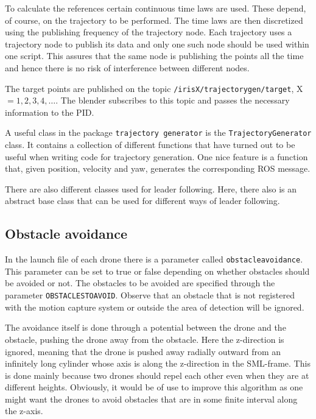 \documentclass[titlepage,11pt,a4paper]{article}
\begin{document}
To calculate the references certain continuous time laws are
used. These depend, of course, on the trajectory to be performed. The
time laws are then discretized using the publishing frequency of the
trajectory node. Each trajectory uses a trajectory node to publish its
data and only one such node should be used within one script. This
assures that the same node is publishing the points all the time and
hence there is no risk of interference between different nodes.

The target points are published on the topic
\texttt{/irisX/trajectory\textunderscore gen/target}, X $= 1, 2, 3,
4, \dots$. The blender subscribes to this topic and passes the
necessary information to the PID.

A useful class in the package \texttt{trajectory\textunderscore
  generator} is the \texttt{TrajectoryGenerator} class. It contains a
collection of different functions that have turned out to be useful
when writing code for trajectory generation. One nice feature is a
function that, given position, velocity and yaw, generates the
corresponding ROS message.

There are also different classes used for leader following. Here,
there also is an abstract base class that can be used for different
ways of leader following.

\subsection{Obstacle avoidance}
\label{subsec:obstacle_avoidance}
In the launch file of each drone there is a parameter called
\texttt{obstacle\textunderscore avoidance}. This parameter can be set to true
or false depending on whether obstacles should be avoided or not. The
obstacles to be avoided are specified through the parameter
\texttt{OBSTACLES\textunderscore TO\textunderscore AVOID}. Observe that an
obstacle that is not registered with the motion capture system or
outside the area of detection will be ignored.

The avoidance itself is done through a potential between the drone and
the obstacle, pushing the drone away from the obstacle. Here the
z-direction is ignored, meaning that the drone is pushed away radially
outward from an infinitely long cylinder whose axis is along the
z-direction in the SML-frame. This is done mainly because two drones
should repel each other even when they are at different
heights. Obviously, it would be of use to improve this algorithm as
one might want the drones to avoid obstacles that are in some finite
interval along the z-axis.
\end{document}
